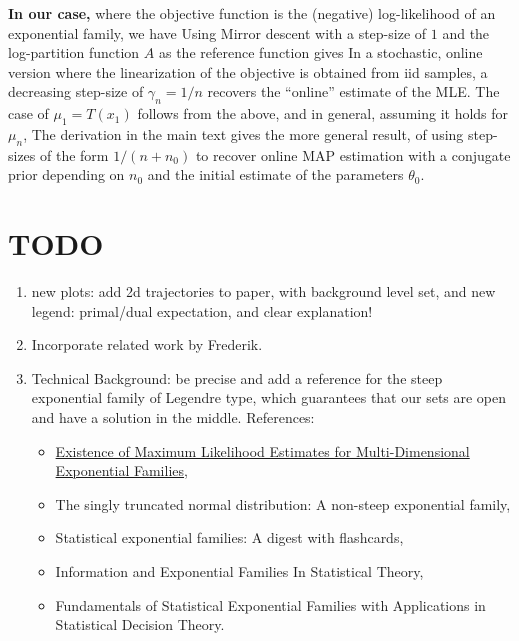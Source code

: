 \documentclass[twoside]{article}
\newcommand{\lin}[1]{\left\langle#1\right\rangle}
\begin{document}
{\bf In our case,} where the objective function is the (negative) log-likelihood of an exponential family, we have
\alignn{
	f(\theta) = A(\theta) - \lin{\frac{1}{n} \sum_{i=1}^n T(X_i), \theta}.
}
Using Mirror descent with a step-size of $1$ and the log-partition function $A$ as the reference function gives
In a stochastic, online version 
where the linearization of the objective is obtained from iid samples, 
a decreasing step-size of $\gamma_n = 1/n$ recovers the ``online'' estimate of the MLE.
The case of $\mu_1 = T(x_1)$ follows from the above, 
and in general, assuming it holds for $\mu_n$, 
The derivation in the main text gives the more general result, 
of using step-sizes of the form $1/(n+n_0)$ to recover online MAP estimation 
with a conjugate prior depending on $n_0$ and the initial estimate of the parameters $\theta_0$.

	





\iffalse
\section{TODO}
\begin{enumerate}
	\item new plots: add 2d trajectories to paper, with background level set, and new legend: primal/dual expectation, and clear explanation!
	\item Incorporate related work by Frederik.
	\item Technical Background: be precise and add a reference for the steep exponential family of Legendre type, which guarantees that our sets are open and have a solution in the middle.
	References: \begin{itemize}
		\item \href{https://www.jstor.org/stable/4616462?seq=1#metadata_info_tab_contents}{Existence of Maximum Likelihood Estimates for Multi-Dimensional Exponential Families},
		\item The singly truncated normal distribution: A non-steep exponential family,
		\item Statistical exponential families: A digest with flashcards,
		\item Information and Exponential Families In Statistical Theory,
		\item Fundamentals of Statistical Exponential Families with Applications in Statistical Decision Theory.
	\end{itemize}
\end{enumerate}
\end{document}
